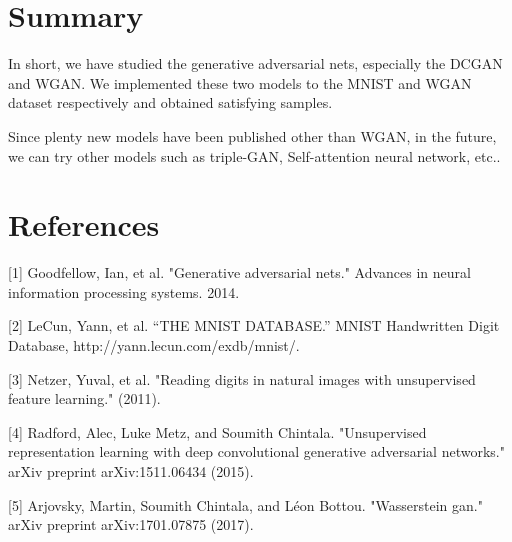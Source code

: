 \documentclass{article}
\begin{document}
\section{Summary}

In short, we have studied the generative adversarial nets, especially the DCGAN and WGAN. We implemented these two models to the MNIST and WGAN dataset respectively and obtained satisfying samples.

Since plenty new models have been published other than WGAN, in the future, we can try other models such as triple-GAN, Self-attention neural network, etc..

\clearpage
\section*{References}

[1] Goodfellow, Ian, et al. "Generative adversarial nets." Advances in neural information processing systems. 2014.

[2] LeCun, Yann, et al. “THE MNIST DATABASE.” MNIST Handwritten Digit Database, http://yann.lecun.com/exdb/mnist/.

[3] Netzer, Yuval, et al. "Reading digits in natural images with unsupervised feature learning." (2011).

[4] Radford, Alec, Luke Metz, and Soumith Chintala. "Unsupervised representation learning with deep convolutional generative adversarial networks." arXiv preprint arXiv:1511.06434 (2015).

[5] Arjovsky, Martin, Soumith Chintala, and Léon Bottou. "Wasserstein gan." arXiv preprint arXiv:1701.07875 (2017).
\end{document}
